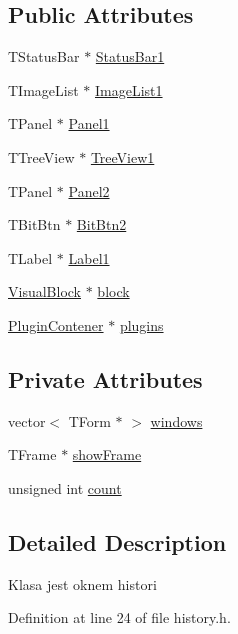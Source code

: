 \subsection*{Public Attributes}
\begin{CompactItemize}
\item 
TStatusBar $\ast$ \hyperlink{classTHistory_a3f5f2b91a14af33829123e0aaca3928}{StatusBar1}
\item 
TImageList $\ast$ \hyperlink{classTHistory_d1855973aa68d9e9cca14f5632ddfae8}{ImageList1}
\item 
TPanel $\ast$ \hyperlink{classTHistory_4b99f5e227a8e165e6d64be62227c458}{Panel1}
\item 
TTreeView $\ast$ \hyperlink{classTHistory_ce7f826948e9130c7c20d879e7b8d80c}{TreeView1}
\item 
TPanel $\ast$ \hyperlink{classTHistory_628b8da1ed6bee8471e6baa1d8d9911a}{Panel2}
\item 
TBitBtn $\ast$ \hyperlink{classTHistory_58430353f17dbe5b387caabeb221f65b}{BitBtn2}
\item 
TLabel $\ast$ \hyperlink{classTHistory_b308f0efb659683a8d9c7881ca03f2c7}{Label1}
\item 
\hyperlink{classVisualBlock}{VisualBlock} $\ast$ \hyperlink{classTHistory_f4c969766311242d1c6d66cd9b126356}{block}
\item 
\hyperlink{classPluginContener}{PluginContener} $\ast$ \hyperlink{classTHistory_c2d0ea83df40a55b1c899bd87af9652f}{plugins}
\end{CompactItemize}
\subsection*{Private Attributes}
\begin{CompactItemize}
\item 
vector$<$ TForm $\ast$ $>$ \hyperlink{classTHistory_46b9676e3638c8006171026e66f96306}{windows}
\item 
TFrame $\ast$ \hyperlink{classTHistory_bd6410d2b6668ee021fe128e6b7cc874}{showFrame}
\item 
unsigned int \hyperlink{classTHistory_716bcd58a7ba40e8003454d811a64cd0}{count}
\end{CompactItemize}


\subsection{Detailed Description}
Klasa jest oknem histori 

Definition at line 24 of file history.h.

